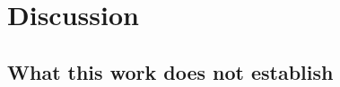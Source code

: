 %

\section{Discussion}
\label{sec:d1}

%

\subsection{What this work does not establish}
\label{sec:limits}

%

\begin{figure}[t]\centering
  \begin{panelbox}
  \end{panelbox}
  \caption{\label{fig:931}}
\end{figure}
